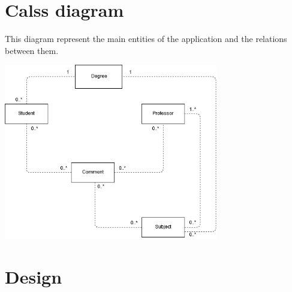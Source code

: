 \documentclass[a4paper, oneside]{article}
\begin{document}
\clearpage


\section{Calss diagram}
This diagram represent the main entities of the application and the relations between them.
\begin{minipage}{\linewidth}
\begin{center}
\vspace{4mm}
\includegraphics[width = 0.7\textwidth]{./images/diagrams/AnalysisUML.png} 
\vspace{2mm}
\label{fig:useCases}
\end{center}
\end{minipage}
\clearpage
\section{Design}
\end{document}
